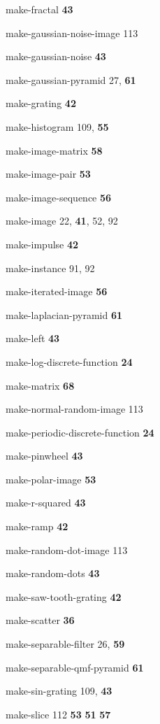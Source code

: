 \begin{theindex}
\item {\ptt make-fractal} {\bf 43}
\item {\ptt make-gaussian-noise-image} 113
\item {\ptt make-gaussian-noise} {\bf 43}
\item {\ptt make-gaussian-pyramid} 27, {\bf 61}
\item {\ptt make-grating} {\bf 42}
\item {\ptt make-histogram} 109, {\bf 55}
\item {\ptt make-image-matrix} {\bf 58}
\item {\ptt make-image-pair} {\bf 53}
\item {\ptt make-image-sequence} {\bf 56}
\item {\ptt make-image} 22, {\bf 41}, 52, 92
\item {\ptt make-impulse} {\bf 42}
\item {\ptt make-instance} 91, 92
\item {\ptt make-iterated-image} {\bf 56}
\item {\ptt make-laplacian-pyramid} {\bf 61}
\item {\ptt make-left} {\bf 43}
\item {\ptt make-log-discrete-function} {\bf 24}
\item {\ptt make-matrix} {\bf 68}
\item {\ptt make-normal-random-image} 113
\item {\ptt make-periodic-discrete-function} {\bf 24}
\item {\ptt make-pinwheel} {\bf 43}
\item {\ptt make-polar-image} {\bf 53}
\item {\ptt make-r-squared} {\bf 43}
\item {\ptt make-ramp} {\bf 42}
\item {\ptt make-random-dot-image} 113
\item {\ptt make-random-dots} {\bf 43}
\item {\ptt make-saw-tooth-grating} {\bf 42}
\item {\ptt make-scatter}
 {\bf 36}
\item {\ptt make-separable-filter} 26, {\bf 59}
\item {\ptt make-separable-qmf-pyramid} {\bf 61}
\item {\ptt make-sin-grating} 109, {\bf 43}
\item {\ptt make-slice} 112
 {\bf 53}
 {\bf 51}
 {\bf 57}

\end{theindex}
